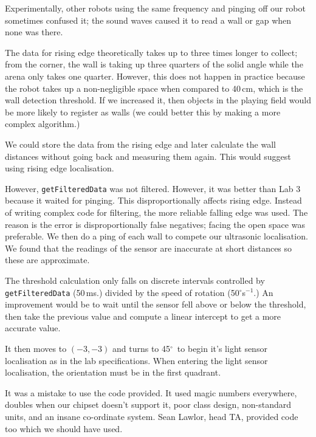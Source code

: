 \documentclass[twocolumn]{article}
\def\degree{\ensuremath{^\circ}}
\begin{document}
Experimentally, other robots using the same frequency and pinging off our robot sometimes confused it; the sound waves caused it to read a wall or gap when none was there.

The data for rising edge theoretically takes up to three times longer to collect; from the corner, the wall is taking up three quarters of the solid angle while the arena only takes one quarter. However, this does not happen in practice because the robot takes up a non-negligible space when compared to 40\,cm, which is the wall detection threshold. If we increased it, then objects in the playing field would be more likely to register as walls (we could better this by making a more complex algorithm.)

We could store the data from the rising edge and later calculate the wall distances without going back and measuring them again. This would suggest using rising edge localisation.

However, {\tt getFilteredData} was not filtered. However, it was better than Lab 3\cite{alexneil3} because it waited for pinging. This disproportionally affects rising edge. Instead of writing complex code for filtering, the more reliable falling edge was used. The reason is the error is disproportionally false negatives; facing the open space was preferable. We then do a ping of each wall to compete our ultrasonic localisation. We found that the readings of the sensor are inaccurate at short distances so these are approximate.

The threshold calculation only falls on discrete intervals controlled by {\tt getFilteredData} (50\,ms.) divided by the speed of rotation (50\degree s$^{-1}$.) An improvement would be to wait until the sensor fell above or below the threshold, then take the previous value and compute a linear intercept to get a more accurate value.

It then moves to $(-3, -3)$ and turns to 45\degree~to begin it's light sensor localisation as in the lab specifications\cite{lab4}. When entering the light sensor localisation, the orientation must be in the first quadrant.



It was a mistake to use the code provided. It used magic numbers everywhere, doubles when our chipset doesn't support it, poor class design, non-standard units, and an insane co-ordinate system. Sean Lawlor, head TA, provided code too which we should have used.
\end{document}
